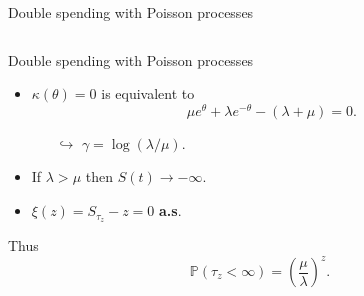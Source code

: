 \documentclass{beamer}
\begin{document}
\begin{frame}{Double spending with Poisson processes}
\begin{columns}
\begin{column}{0.5\textwidth}
\end{column}
\end{columns}
\end{frame}
\begin{frame}{Double spending with Poisson processes}
\scriptsize
\begin{itemize}
\item $\kappa(\theta)=0$ is equivalent to
$$
\mu e^{\theta}+\lambda e^{-\theta}-(\lambda+\mu)=0.
$$

\begin{itemize}
\item[$\hookrightarrow$] $\gamma=\log(\lambda/\mu).$
\end{itemize}
\item If $\lambda>\mu$ then $S(t)\rightarrow - \infty$.
\item $\xi(z)=S_{\tau_z}-z=0$ \textbf{a.s}.
\end{itemize}
Thus
$$\mathbb{P}(\tau_z<\infty)=\left(\frac{\mu}{\lambda}\right)^{z}.$$

\end{frame}
\end{document}
